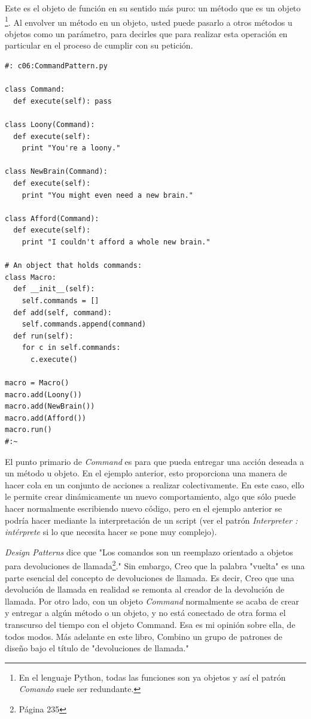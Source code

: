 \documentclass{article}
\begin{document}
Este es el objeto de función en su sentido más puro: un método que es un objeto \footnote{En el lenguaje Python, todas las funciones son ya objetos y así el patrón \textit{Comando} suele ser redundante.}. Al envolver un método en un objeto, usted puede pasarlo a otros métodos u objetos como un parámetro, para decirles que para realizar esta operación en particular en el proceso de cumplir con su petición.     \newline

\begin{lstlisting}
#: c06:CommandPattern.py 

class Command: 
  def execute(self): pass 
  
class Loony(Command): 
  def execute(self): 
    print "You're a loony." 
    
class NewBrain(Command): 
  def execute(self): 
    print "You might even need a new brain." 
    
class Afford(Command): 
  def execute(self): 
    print "I couldn't afford a whole new brain."
    
# An object that holds commands: 
class Macro: 
  def __init__(self): 
    self.commands = [] 
  def add(self, command):  
    self.commands.append(command)  
  def run(self): 
    for c in self.commands: 
      c.execute() 
      
macro = Macro() 
macro.add(Loony()) 
macro.add(NewBrain()) 
macro.add(Afford()) 
macro.run() 
#:~       
\end{lstlisting}

El punto primario de \textit{Command} es para que pueda entregar una acción deseada a un método u objeto. En el ejemplo anterior, esto proporciona una manera de hacer cola en un conjunto de acciones a realizar colectivamente. En este caso, ello le permite crear dinámicamente un nuevo comportamiento, algo que sólo puede hacer normalmente escribiendo nuevo código, pero en el ejemplo anterior se podría hacer mediante la interpretación de un script (ver el patrón \textit{Interpreter : intérprete} si lo que necesita hacer se pone muy complejo). \newline

\textit{Design Patterns} dice que "Los comandos son un reemplazo orientado a objetos para devoluciones de llamada\footnote{Página 235}." Sin embargo, Creo que la palabra "vuelta" es una parte esencial del concepto de devoluciones de llamada. Es decir, Creo que una devolución de llamada en realidad se remonta al creador de la devolución de llamada. Por otro lado, con un objeto \textit{Command} normalmente se acaba de crear y entregar a algún método o un objeto,  y no está conectado de otra forma el transcurso del tiempo con el objeto Command. Esa es mi opinión sobre ella, de todos modos. Más adelante en este libro, Combino un grupo de patrones de diseño bajo el título de "devoluciones de llamada."  \newline
\end{document}
